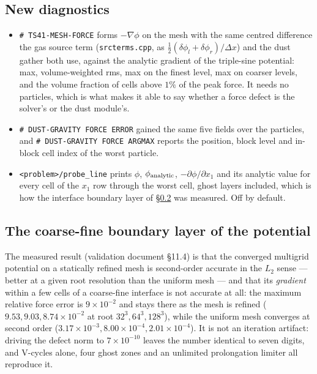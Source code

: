 \documentclass[11pt]{article}
\newcommand{\code}[1]{\texttt{#1}}
\newcommand{\file}[1]{\texttt{\small #1}}
\begin{document}
\subsection{New diagnostics}

\begin{itemize}\itemsep3pt
\item \code{\# TS41-MESH-FORCE} forms $-\nabla\phi$ on the mesh with the same centred
      difference the gas source term (\file{srcterms.cpp}, as $\tfrac12(\delta\phi_l +
      \delta\phi_r)/\Delta x$) and the dust gather both use, against the analytic
      gradient of the triple-sine potential: max, volume-weighted rms, max on the finest
      level, max on coarser levels, and the volume fraction of cells above $1\%$ of the
      peak force. It needs no particles, which is what makes it able to say whether a
      force defect is the solver's or the dust module's.
\item \code{\# DUST-GRAVITY FORCE ERROR} gained the same five fields over the particles,
      and \code{\# DUST-GRAVITY FORCE ARGMAX} reports the position, block level and
      in-block cell index of the worst particle.
\item \code{<problem>/probe\_line} prints $\phi$, $\phi_{\rm analytic}$,
      $-\partial\phi/\partial x_1$ and its analytic value for every cell of the $x_1$ row
      through the worst cell, ghost layers included, which is how the interface boundary
      layer of \S\ref{sec:gravsmr-layer} was measured. Off by default.
\end{itemize}

\subsection{The coarse-fine boundary layer of the potential}
\label{sec:gravsmr-layer}

The measured result (validation document \S11.4) is that the
converged multigrid potential on a statically refined mesh is second-order accurate in
the $L_2$ sense --- better at a given root resolution than the uniform mesh --- and that
its \emph{gradient} within a few cells of a coarse-fine interface is not accurate at all:
the maximum relative force error is $9\times10^{-2}$ and stays there as the mesh is
refined ($9.53, 9.03, 8.74 \times10^{-2}$ at root $32^3, 64^3, 128^3$), while the uniform
mesh converges at second order ($3.17\times10^{-3}, 8.00\times10^{-4},
2.01\times10^{-4}$). It is not an iteration artifact: driving the defect norm to
$7\times10^{-10}$ leaves the number identical to seven digits, and V-cycles alone, four
ghost zones and an unlimited prolongation limiter all reproduce it.
\end{document}
